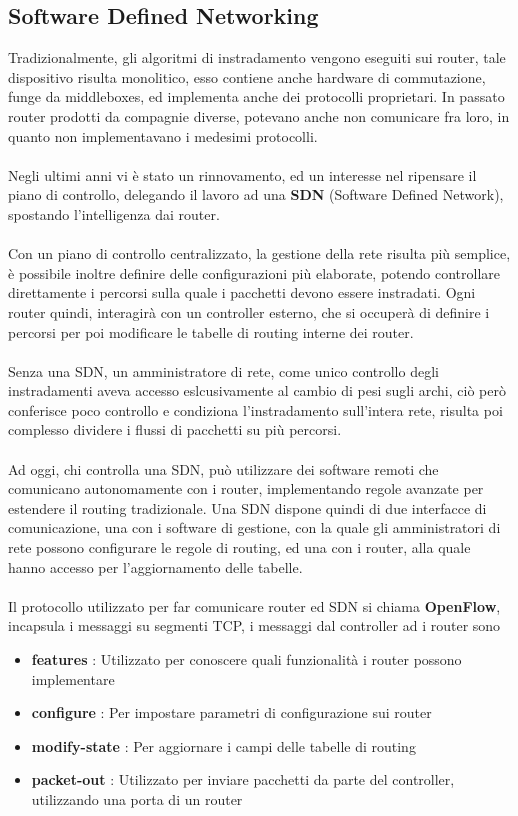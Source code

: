 \documentclass[12pt, letterpaper]{article}
\newcommand{\acc}{\\\hphantom{}\\}
\begin{document}
\subsection{Software Defined Networking}
Tradizionalmente, gli algoritmi di instradamento vengono eseguiti sui router, tale dispositivo risulta 
monolitico, esso contiene anche hardware di commutazione, funge da middleboxes, ed implementa anche dei 
protocolli proprietari. In passato router prodotti da compagnie diverse, potevano anche non comunicare fra loro, in 
quanto non implementavano i medesimi protocolli.\acc 
Negli ultimi anni vi è stato un rinnovamento, ed un interesse nel ripensare il piano di controllo, delegando il 
lavoro ad una \textbf{SDN} (Software Defined Network), spostando l'intelligenza dai router.\acc 
Con un piano di controllo centralizzato, la gestione della rete risulta più semplice, è possibile inoltre definire 
delle configurazioni più elaborate, potendo controllare direttamente i percorsi sulla quale i pacchetti devono essere 
instradati. Ogni router quindi, interagirà con un controller esterno, che si occuperà di definire i percorsi 
per poi modificare le tabelle di routing interne dei router.\acc 
Senza una SDN, un amministratore di rete, come unico controllo degli instradamenti aveva accesso 
eslcusivamente al cambio di pesi sugli archi, ciò però conferisce poco controllo e condiziona l'instradamento 
sull'intera rete, risulta poi complesso dividere i flussi di pacchetti su più percorsi.\acc 
Ad oggi, chi controlla una SDN, può utilizzare dei software remoti che comunicano autonomamente con i router, 
implementando regole avanzate per estendere il routing tradizionale. Una SDN dispone quindi di due interfacce di comunicazione, 
una con i software di gestione, con la quale gli amministratori di rete possono configurare le regole di routing, ed una 
con i router, alla quale hanno accesso per l'aggiornamento delle tabelle.\acc 
Il protocollo utilizzato per far comunicare router ed SDN si chiama \textbf{OpenFlow}, incapsula i messaggi su 
segmenti TCP, i messaggi dal controller ad i router sono\begin{itemize}
    \item \textbf{features} : Utilizzato per conoscere quali funzionalità i router possono implementare  
    \item \textbf{configure} : Per impostare parametri di configurazione sui router 
    \item \textbf{modify-state} : Per aggiornare i campi delle tabelle di routing 
    \item \textbf{packet-out} : Utilizzato per inviare pacchetti da parte del controller, utilizzando una porta di un router
\end{itemize}
\end{document}
